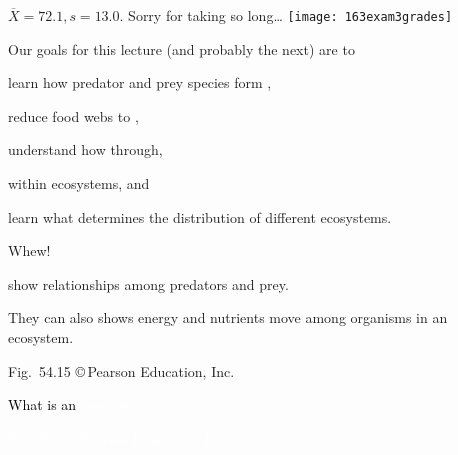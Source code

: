 \documentclass[t]{beamer}
\begin{document}

\begin{frame}[t]{$\overline{X} = 72.1, s = 13.0.$ Sorry for taking so long\dots}
	\texttt{[image: 163exam3grades]}\par
	
\end{frame}
%


\begin{frame}{Our goals for this lecture (and probably the next) are to}

	\hangpara learn how predator and prey species form ,

	\hangpara reduce food webs to , 
	
	\hangpara understand how  through, 
	
	\hangpara {} within ecosystems, and
	
	\hangpara learn what determines the distribution of different ecosystems.
	
	\vfilll
	
	\hfill \tiny Whew!
	
\end{frame}
%
{
\begin{frame}{}
\hspace{65mm}\begin{minipage}{0.45\textwidth}
	\flushleft
	\vspace{4\baselineskip}

	 show relationships among predators and prey.
	\vspace{\baselineskip}
	
	They can also shows energy and nutrients move among organisms in an ecosystem.
\end{minipage}

	\vfilll
	
	\hfill \tiny Fig.~54.15 \copyright\,Pearson Education, Inc.
\end{frame}
}
%
{
\begin{frame}[b]{\textcolor{black}{What is an \textcolor{white}{ecosystem?} }}

\tiny \textcolor{white}{Fig.~55.2 \copyright\,Pearson Education, Inc.}
\end{frame}
}
\end{document}
